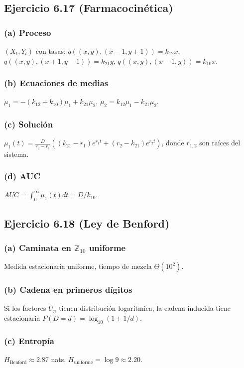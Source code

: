 \documentclass[12pt]{article}
\newcommand{\Z}{\mathbb{Z}}
\newcommand{\1}{\mathbf{1}}
\begin{document}
\subsection{Ejercicio 6.17 (Farmacocin\'etica)}

\subsubsection*{(a) Proceso}
$(X_t,Y_t)$ con tasas: $q((x,y),(x-1,y+1))=k_{12}x$, $q((x,y),(x+1,y-1))=k_{21}y$, $q((x,y),(x-1,y))=k_{10}x$.

\subsubsection*{(b) Ecuaciones de medias}
$\dot{\mu}_1=-(k_{12}+k_{10})\mu_1+k_{21}\mu_2$, $\dot{\mu}_2=k_{12}\mu_1-k_{21}\mu_2$.

\subsubsection*{(c) Soluci\'on}
$\mu_1(t)=\frac{D}{r_2-r_1}\left((k_{21}-r_1)e^{r_1t}+(r_2-k_{21})e^{r_2t}\right)$, donde $r_{1,2}$ son ra\'ices del sistema.

\subsubsection*{(d) AUC}
$AUC=\int_0^\infty\mu_1(t)dt=D/k_{10}$.

\subsection{Ejercicio 6.18 (Ley de Benford)}

\subsubsection*{(a) Caminata en $\Z_{10}$ uniforme}
Medida estacionaria uniforme, tiempo de mezcla $\Theta(10^2)$.

\subsubsection*{(b) Cadena en primeros d\'igitos}
Si los factores $U_n$ tienen distribuci\'on logar\'itmica, la cadena inducida tiene estacionaria $P(D=d)=\log_{10}(1+1/d)$.

\subsubsection*{(c) Entrop\'ia}
$H_{\text{Benford}}\approx2.87$ nats, $H_{\text{uniforme}}=\log9\approx2.20$.
\end{document}
